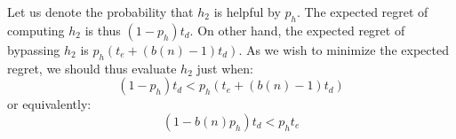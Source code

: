 


Let us denote the probability that $h_2$ is helpful by
$p_h$.
The expected regret of computing $h_2$ is thus $(1-p_h) t_d$.
On other hand, the expected regret of bypassing $h_2$ is $p_h(
t_e+(b(n)-1)t_d)$. As we wish to minimize the expected regret, we should thus evaluate $h_2$ just when:
\begin{equation}
(1-p_h) t_d < p_h (t_e+(b(n)-1)t_d)
\end{equation}
or equivalently:
\begin{equation}
(1-b(n) p_h) t_d < p_h t_e
\end{equation}

